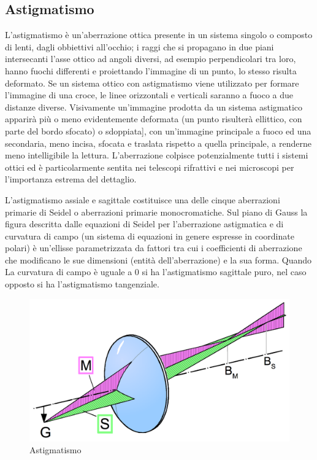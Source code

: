 \subsection{Astigmatismo}

L'astigmatismo è un'aberrazione ottica presente in un sistema singolo o
composto di lenti, dagli obbiettivi all'occhio; i raggi che si propagano in
due piani intersecanti l'asse ottico ad angoli diversi, ad esempio
perpendicolari tra loro, hanno fuochi differenti e proiettando l'immagine di
un punto, lo stesso risulta deformato. Se un sistema ottico con astigmatismo
viene utilizzato per formare l'immagine di una croce, le linee orizzontali e
verticali saranno a fuoco a due distanze diverse. Visivamente un'immagine
prodotta da un sistema astigmatico apparirà più o meno evidentemente deformata
(un punto risulterà ellittico, con parte del bordo sfocato) o sdoppiata], con
un'immagine principale a fuoco ed una secondaria, meno incisa, sfocata e
traslata rispetto a quella principale, a renderne meno intelligibile la
lettura. L'aberrazione colpisce potenzialmente tutti i sistemi ottici ed è
particolarmente sentita nei telescopi rifrattivi e nei microscopi  per
l'importanza estrema del dettaglio.

L'astigmatismo assiale e sagittale costituisce una delle cinque aberrazioni
primarie di Seidel o aberrazioni primarie monocromatiche. Sul piano di Gauss
la figura descritta dalle equazioni di Seidel per l'aberrazione astigmatica e
di curvatura di campo (un sistema di equazioni in genere espresse in
coordinate polari) è un’ellisse parametrizzata da fattori tra cui i
coefficienti di aberrazione che modificano le sue dimensioni (entità
dell'aberrazione) e la sua forma. Quando La curvatura di campo è uguale a 0 si
ha l’astigmatismo sagittale puro, nel caso opposto si ha l’astigmatismo
tangenziale.

\begin{figure}

\centering
\includegraphics[width=.5\textwidth]{img/astigmatismo.png}

\caption{Astigmatismo}
\label{fig:astigmatismo}
\end{figure}

